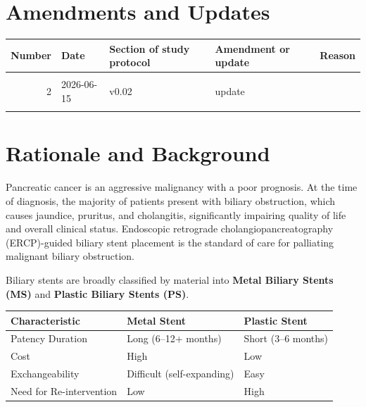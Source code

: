 \documentclass[
  12pt,
]{article}
\begin{document}
\clearpage

\section{Amendments and Updates}\label{amendments-and-updates}

\begin{table}[!h]
\centering\begingroup\fontsize{8}{10}\selectfont

\begin{tabular}{rllll}
\toprule
Number & Date & Section of study protocol & Amendment or update & Reason\\
\midrule
\cellcolor{gray!10}{1} & \cellcolor{gray!10}{2025-03-18} & \cellcolor{gray!10}{v0.01} & \cellcolor{gray!10}{} & \cellcolor{gray!10}{Initial draft}\\
2 & 2026-06-15 & v0.02 & update & \\
\cellcolor{gray!10}{3} & \cellcolor{gray!10}{2026-07-24} & \cellcolor{gray!10}{v0.03} & \cellcolor{gray!10}{update} & \cellcolor{gray!10}{feedback}\\
\bottomrule
\end{tabular}
\endgroup{}
\end{table}

\section{Rationale and Background}\label{rationale-and-background}

Pancreatic cancer is an aggressive malignancy with a poor prognosis. At the time of diagnosis, the majority of patients present with biliary obstruction, which causes jaundice, pruritus, and cholangitis, significantly impairing quality of life and overall clinical status. Endoscopic retrograde cholangiopancreatography (ERCP)-guided biliary stent placement is the standard of care for palliating malignant biliary obstruction.

Biliary stents are broadly classified by material into \textbf{Metal Biliary Stents (MS)} and \textbf{Plastic Biliary Stents (PS)}.

\begin{longtable}[]{@{}lll@{}}
\toprule\noalign{}
Characteristic & Metal Stent & Plastic Stent \\
\midrule\noalign{}
\endhead
\bottomrule\noalign{}
\endlastfoot
Patency Duration & Long (6--12+ months) & Short (3--6 months) \\
Cost & High & Low \\
Exchangeability & Difficult (self-expanding) & Easy \\
Need for Re-intervention & Low & High \\
\end{longtable}
\end{document}
